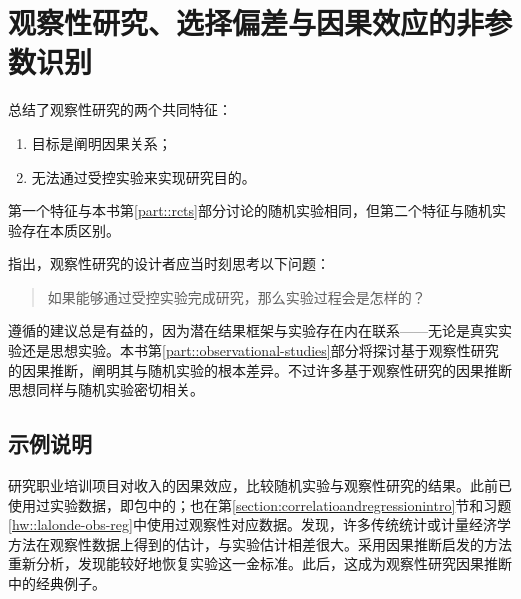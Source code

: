 \chapter{观察性研究、选择偏差与因果效应的非参数识别}\label{chapter::observational-studies}

 
\citet{cochran1965planning}总结了观察性研究的两个共同特征：
\begin{enumerate}
\item
目标是阐明因果关系；
\item 
无法通过受控实验来实现研究目的。
\end{enumerate}

第一个特征与本书第\ref{part::rcts}部分讨论的随机实验相同，但第二个特征与随机实验存在本质区别。 


\citet{dorn1953philosophy}指出，观察性研究的设计者应当时刻思考以下问题：
\begin{quote}
如果能够通过受控实验完成研究，那么实验过程会是怎样的？
\end{quote}
遵循\citet{dorn1953philosophy}的建议总是有益的，因为潜在结果框架与实验存在内在联系——无论是真实实验还是思想实验。本书第\ref{part::observational-studies}部分将探讨基于观察性研究的因果推断，阐明其与随机实验的根本差异。不过许多基于观察性研究的因果推断思想同样与随机实验密切相关。 

 


\section{示例说明}
 
 \begin{example}
 [职业培训项目]\label{eg::job-training-obs}
 \citet{lalonde1986evaluating}研究职业培训项目对收入的因果效应，比较随机实验与观察性研究的结果。此前已使用过实验数据，即包中的；也在第\ref{section:correlatioandregressionintro}节和习题\ref{hw::lalonde-obs-reg}中使用过观察性对应数据。\citet{lalonde1986evaluating}发现，许多传统统计或计量经济学方法在观察性数据上得到的估计，与实验估计相差很大。\cite{dehejia1999causal}采用因果推断启发的方法重新分析，发现能较好地恢复实验这一金标准。此后，这成为观察性研究因果推断中的经典例子。 
 \end{example}
 
